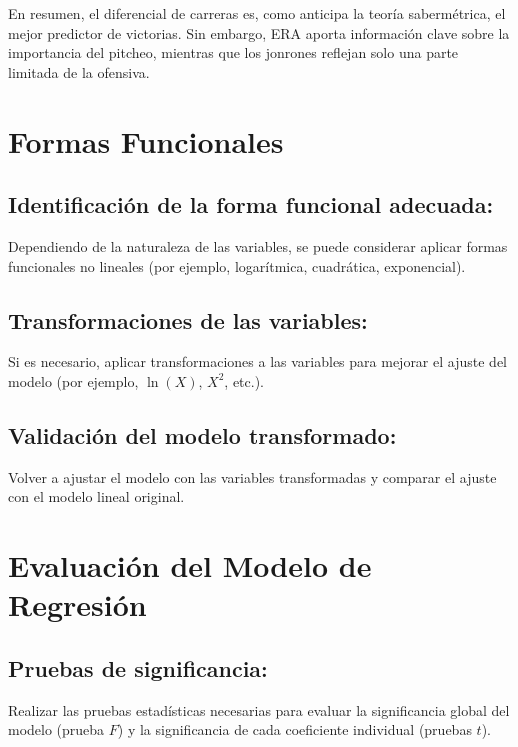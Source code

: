 \documentclass[10pt]{article}
\begin{document}
\noindent En resumen, el diferencial de carreras es, como anticipa la teoría sabermétrica, el mejor predictor de victorias. Sin embargo, ERA aporta información clave sobre la importancia del pitcheo, mientras que los jonrones reflejan solo una parte limitada de la ofensiva.
\section{Formas Funcionales}
\subsection{Identificación de la forma funcional adecuada:}
Dependiendo de la naturaleza de las variables, se puede considerar aplicar formas funcionales no lineales (por ejemplo, logarítmica, cuadrática, exponencial).

\subsection{Transformaciones de las variables:}
Si es necesario, aplicar transformaciones a las variables para mejorar el ajuste del modelo (por ejemplo, \( \ln(X) \), \( X^2 \), etc.).

\subsection{Validación del modelo transformado:}
Volver a ajustar el modelo con las variables transformadas y comparar el ajuste con el modelo lineal original.
\section{Evaluación del Modelo de Regresión}
\subsection{Pruebas de significancia:}
Realizar las pruebas estadísticas necesarias para evaluar la significancia global del modelo (prueba \(F\)) y la significancia de cada coeficiente individual (pruebas \(t\)).
\end{document}
